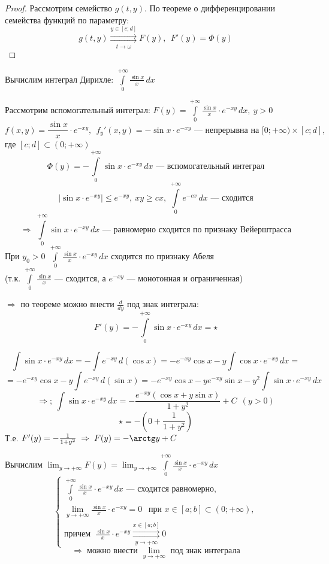 \begin{properties}
\begin{enumerate}
\begin{proof}
            Рассмотрим семейство $g(t, y)$. По теореме о дифференцировании семейства функций по параметру:
            \[ g(t, y) \overset{y \in [c; d]}{\underset{t \to \omega}{\rightrightarrows}} F(y), \ \ F'(y) = \Phi(y) \]
        \end{proof}
        
        \begin{example}
            Вычислим интеграл Дирихле: $\int\limits_0^{+\infty} \frac{\sin x}x\,dx$
            
            Рассмотрим вспомогательный интеграл: $F(y) = \int\limits_0^{+\infty} \frac{\sin x}x \cdot e^{-xy}\,dx, \ y > 0$
            \[ f(x, y) = \frac{\sin x}x \cdot e^{-xy}, \ \ f_y'(x, y) = -\sin x \cdot e^{-xy} 
            \text{ --- непрерывна на } [0; +\infty) \times [c; d], \]
            где $[c; d] \subset (0; +\infty)$
            \[ \Phi(y) = -\int\limits_0^{+\infty} \sin x \cdot e^{-xy}\,dx \text{ --- вспомогательный интеграл} \]
            \[ \left| \sin x \cdot e^{-xy} \right| \le e^{-xy}, \ xy \ge cx, \ \int\limits_0^{+\infty} e^{-cx}\,dx \text{ --- сходится} \]
            \[ \Rightarrow\; \int\limits_0^{+\infty} \sin x \cdot e^{-xy}\,dx \text{ --- равномерно сходится по признаку Вейерштрасса} \]
            При $y_0 > 0 \ \ \int\limits_0^{+\infty} \frac{\sin x}x \cdot e^{-xy}\,dx$ сходится по признаку Абеля \\
            (т.к. $\int\limits_0^{+\infty} \frac{\sin x}x$ --- сходится, а $e^{-xy}$ --- монотонная и ограниченная)
            
            $\Rightarrow$ по теореме можно внести $\frac{d}{dy}$ под знак интеграла:
            \[ F'(y) = -\int\limits_0^{+\infty} \sin x \cdot e^{-xy}\,dx = \star \]
            
            \[ \int \sin x \cdot e^{-xy}\,dx = -\int e^{-xy}\,d(\cos x) = -e^{-xy} \cos x - y \int \cos x \cdot e^{-xy}\,dx = \]
            \[ = -e^{-xy} \cos x - y \int e^{-xy}\,d(\sin x) = -e^{-xy} \cos x - y e^{-xy} \sin x - y^2 \int \sin x \cdot e^{-xy}\,dx \]
            \[ \Rightarrow;\ \int \sin x \cdot e^{-xy}\,dx = -\frac{e^{-xy} (\cos x + y \sin x)}{1 + y^2} + C \ \ (y > 0) \]
            \[ \star = -\left( 0 + \frac1{1 + y^2} \right) \]
            Т.е. $F'(y) = -\frac1{1 + y^2} \;\Rightarrow\; F(y) = -\arctg y + C$
            
            Вычислим $\lim_{y \to +\infty} F(y) = \lim_{y \to +\infty} \int\limits_0^{+\infty} \frac{\sin x}x \cdot e^{-xy}\,dx$
            \[ \left\{\begin{array}{l} 
            \int\limits_0^{+\infty} \frac{\sin x}x \cdot e^{-xy}\,dx \text{ --- сходится равномерно}, \\
            \lim_{y \to +\infty} \frac{\sin x}x \cdot e^{-xy} = 0 \ \ \text{ при } x \in [a; b] \subset (0; +\infty), \\
            \text{причем } \ \frac{\sin x}x \cdot e^{-xy} \overset{x \in [a; b]}{\underset{y \to +\infty}{\rightrightarrows}} 0
            \end{array}\right. \]
            \[ \Rightarrow\; \text{можно внести } \lim_{y \to +\infty} \text{ под знак интеграла} \]
            

\end{example}
\end{enumerate}
\end{properties}
